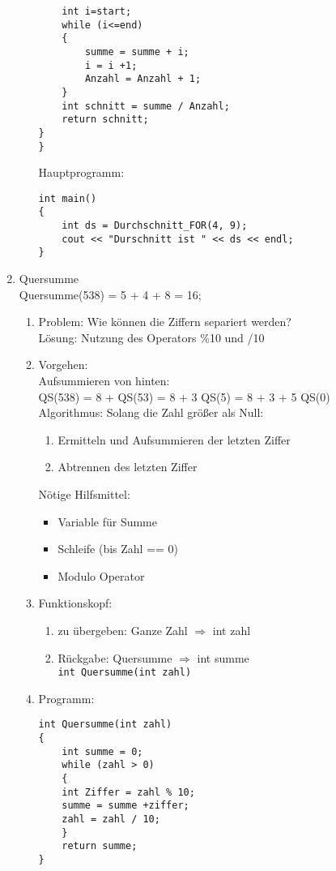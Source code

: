 \begin{enumerate}
\begin{enumerate}
\begin{lstlisting}
	int i=start;
	while (i<=end)
	{
		summe = summe + i;
		i = i +1;
		Anzahl = Anzahl + 1;
	}
	int schnitt = summe / Anzahl;
	return schnitt;
}
}
\end{lstlisting}
Hauptprogramm:
\begin{lstlisting}
int main()
{
	int ds = Durchschnitt_FOR(4, 9);
	cout << "Durschnitt ist " << ds << endl;
}
\end{lstlisting}
\end{enumerate}
\item Quersumme \\
Quersumme(538) = 5 + 4 + 8 = 16; \\
\begin{enumerate}
\item Problem: Wie können die Ziffern separiert werden? \\
	Lösung: Nutzung des Operators \%10 und /10
\item Vorgehen: \\
	Aufsummieren von hinten: \\
	QS(538) = 8 + QS(53) = 8 + 3 QS(5) = 8 + 3 + 5 QS(0) \\
	Algorithmus: Solang die Zahl größer als Null:
	\begin{enumerate}
	\item Ermitteln und Aufsummieren der letzten Ziffer
	\item Abtrennen des letzten Ziffer
	\end{enumerate}
	Nötige Hilfsmittel:
	\begin{itemize}
	\item Variable für Summe
	\item Schleife (bis Zahl == 0)
	\item Modulo Operator
	\end{itemize}
\item Funktionskopf:
\begin{enumerate}
\item zu übergeben: Ganze Zahl $\Rightarrow$ int zahl
\item Rückgabe: Quersumme $\Rightarrow$ int summe \\
\lstinline{int Quersumme(int zahl)}
\end{enumerate}
\item Programm:
\begin{lstlisting}
int Quersumme(int zahl)
{
	int summe = 0;
	while (zahl > 0)
	{
	int Ziffer = zahl % 10;
	summe = summe +ziffer;
	zahl = zahl / 10;
	}
	return summe;
}
\end{lstlisting}
\newpage


\end{enumerate}
\end{enumerate}
